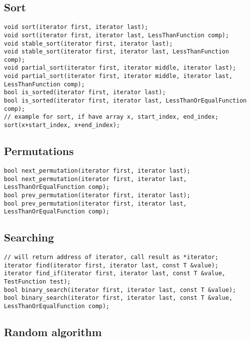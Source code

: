 \documentclass[a4paper]{article}
\begin{document}
\subsection{Sort}

\begin{verbatim}
void sort(iterator first, iterator last);
void sort(iterator first, iterator last, LessThanFunction comp);
void stable_sort(iterator first, iterator last);
void stable_sort(iterator first, iterator last, LessThanFunction comp);
void partial_sort(iterator first, iterator middle, iterator last);
void partial_sort(iterator first, iterator middle, iterator last, LessThanFunction comp);
bool is_sorted(iterator first, iterator last);
bool is_sorted(iterator first, iterator last, LessThanOrEqualFunction comp);
// example for sort, if have array x, start_index, end_index;
sort(x+start_index, x+end_index);
\end{verbatim}

\subsection{Permutations}
\begin{verbatim}
bool next_permutation(iterator first, iterator last);
bool next_permutation(iterator first, iterator last, LessThanOrEqualFunction comp);
bool prev_permutation(iterator first, iterator last);
bool prev_permutation(iterator first, iterator last, LessThanOrEqualFunction comp);
\end{verbatim}

\subsection{Searching}
\begin{verbatim}
// will return address of iterator, call result as *iterator;
iterator find(iterator first, iterator last, const T &value);
iterator find_if(iterator first, iterator last, const T &value, TestFunction test);
bool binary_search(iterator first, iterator last, const T &value);
bool binary_search(iterator first, iterator last, const T &value, LessThanOrEqualFunction comp);
\end{verbatim}

\subsection{Random algorithm}
\end{document}

